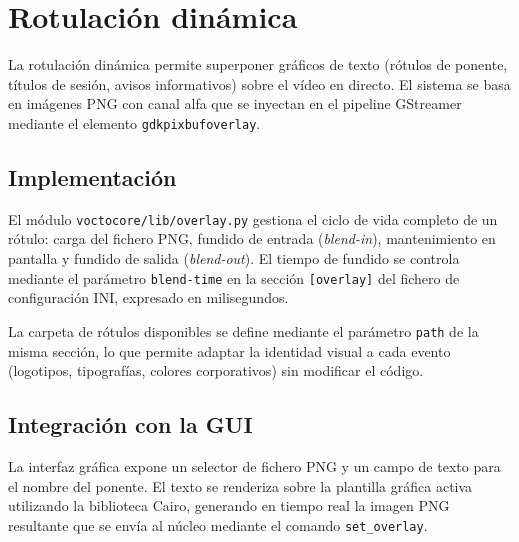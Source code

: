 \section{Rotulación dinámica}

La rotulación dinámica permite superponer gráficos de texto (rótulos de ponente,
títulos de sesión, avisos informativos) sobre el vídeo en directo. El sistema se basa
en imágenes PNG con canal alfa que se inyectan en el pipeline GStreamer mediante el
elemento \texttt{gdkpixbufoverlay}.

\subsection{Implementación}

El módulo \texttt{voctocore/lib/overlay.py} gestiona el ciclo de vida completo de
un rótulo: carga del fichero PNG, fundido de entrada (\textit{blend-in}), mantenimiento
en pantalla y fundido de salida (\textit{blend-out}). El tiempo de fundido se controla
mediante el parámetro \texttt{blend-time} en la sección \texttt{[overlay]} del fichero
de configuración INI, expresado en milisegundos.

La carpeta de rótulos disponibles se define mediante el parámetro \texttt{path} de
la misma sección, lo que permite adaptar la identidad visual a cada evento (logotipos,
tipografías, colores corporativos) sin modificar el código.

\subsection{Integración con la GUI}

La interfaz gráfica expone un selector de fichero PNG y un campo de texto para el
nombre del ponente. El texto se renderiza sobre la plantilla gráfica activa utilizando
la biblioteca Cairo, generando en tiempo real la imagen PNG resultante que se envía
al núcleo mediante el comando \texttt{set\_overlay}.


